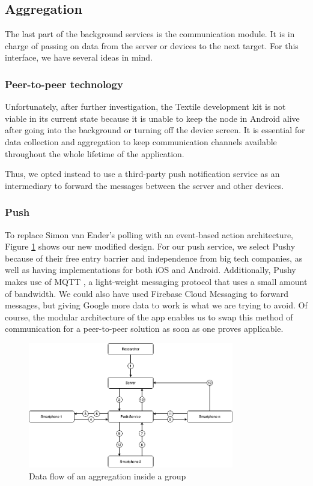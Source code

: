 \subsection{Aggregation}
The last part of the background services is the communication module. It is in charge of passing on data from the server or devices to the next target. For this interface, we have several ideas in mind.
 
\subsubsection{Peer-to-peer technology}
Unfortunately, after further investigation, the Textile development kit is not viable in its current state because it is unable to keep the node in Android alive after going into the background or turning off the device screen. It is essential for data collection and aggregation to keep communication channels available throughout the whole lifetime of the application.

Thus, we opted instead to use a third-party push notification service as an intermediary to forward the messages between the server and other devices.

\subsubsection{Push}
To replace Simon van Ender's polling with an event-based action architecture, Figure \ref{fig:ar2} shows our new modified design. For our push service, we select Pushy \cite{pushy} because of their free entry barrier and independence from big tech companies, as well as having implementations for both iOS and Android. Additionally, Pushy makes use of MQTT \cite{mqtt}, a light-weight messaging protocol that uses a small amount of bandwidth. We could also have used Firebase Cloud Messaging to forward messages, but giving Google more data to work is what we are trying to avoid. Of course, the modular architecture of the app enables us to swap this method of communication for a peer-to-peer solution as soon as one proves applicable.

\begin{figure}[htbp]
  \centering
  \includegraphics[width=0.8\textwidth]{figures/ar2}
  \caption{Data flow of an aggregation inside a group} \label{fig:ar2}
\end{figure}

